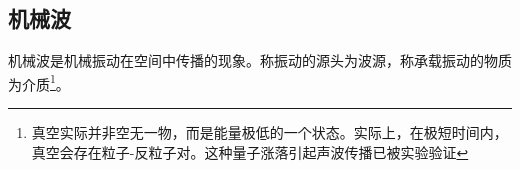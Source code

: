 
\subsection{机械波}
机械波是机械振动在空间中传播的现象。称振动的源头为波源，称承载振动的物质为介质\footnote{真空实际并非空无一物，而是能量极低的一个状态。实际上，在极短时间内，真空会存在粒子-反粒子对。这种量子涨落引起声波传播已被实验验证}。
